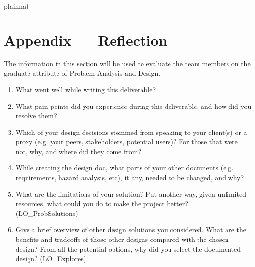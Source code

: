 \documentclass[12pt, titlepage]{article}
\begin{document}
\begin{description}
\begin{description}
\begin{description}
\end{description}

 {plainnat}


\newpage{}

\section*{Appendix --- Reflection}
The information in this section will be used to evaluate the team members on the
graduate attribute of Problem Analysis and Design.



\begin{enumerate}
  \item What went well while writing this deliverable? 
  \item What pain points did you experience during this deliverable, and how
    did you resolve them?
  \item Which of your design decisions stemmed from speaking to your client(s)
  or a proxy (e.g. your peers, stakeholders, potential users)? For those that
  were not, why, and where did they come from?
  \item While creating the design doc, what parts of your other documents (e.g.
  requirements, hazard analysis, etc), it any, needed to be changed, and why?
  \item What are the limitations of your solution?  Put another way, given
  unlimited resources, what could you do to make the project better? (LO\_ProbSolutions)
  \item Give a brief overview of other design solutions you considered.  What
  are the benefits and tradeoffs of those other designs compared with the chosen
  design?  From all the potential options, why did you select the documented design?
  (LO\_Explores)
\end{enumerate}
\end{document}
